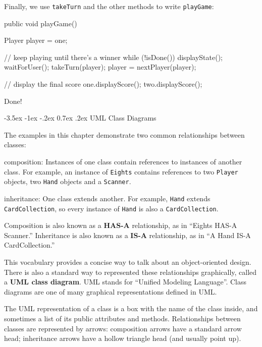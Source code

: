 \documentclass[12pt]{book}
\makeatletter
\theoremstyle{exercise}
\newcommand{\java}[1]{\verb"#1"}
\renewcommand{\section}{\@startsection{section}{1}{\z@}%
    {-3.5ex \@plus -1ex \@minus -.2ex}%
    {0.7ex \@plus.2ex}%
    {\normalfont\Large\bfseries}}
\newcommand{\java}[1]{\lstinline{#1}} %
\makeatother
\begin{document}
Finally, we use \java{takeTurn} and the other methods to write \java{playGame}:

\begin{code}
    public void playGame() {
        Player player = one;

        // keep playing until there's a winner
        while (!isDone()) {
            displayState();
            waitForUser();
            takeTurn(player);
            player = nextPlayer(player);
        }
        
        // display the final score
        one.displayScore();
        two.displayScore();
    }
\end{code}

Done!


\section{UML Class Diagrams}

The examples in this chapter demonstrate two common relationships between classes:

\begin{description}

\item{composition:} Instances of one class contain references to instances of another class.
For example, an instance of \java{Eights} contains references to two \java{Player} objects, two \java{Hand} objects and a \java{Scanner}.

\item{inheritance:} One class extends another.  For example, \java{Hand} extends \java{CardCollection}, so every instance of \java{Hand} is also a \java{CardCollection}.

\end{description}

Composition is also known as a {\bf HAS-A} relationship, as in ``Eights HAS-A Scanner.''
Inheritance is also known as a {\bf IS-A} relationship, as in ``A Hand IS-A CardCollection.''

This vocabulary provides a concise way to talk about an object-oriented design.
There is also a standard way to represented these relationships graphically, called a {\bf UML class diagram}.
UML stands for ``Unified Modeling Language''.
Class diagrams are one of many graphical representations defined in UML. 

The UML representation of a class is a box with the name of the class inside, and sometimes a list of its public attributes and methods.
Relationships between classes are represented by arrows: composition arrows have a standard arrow head; inheritance arrows have a hollow triangle head (and usually point up).
\end{document}
